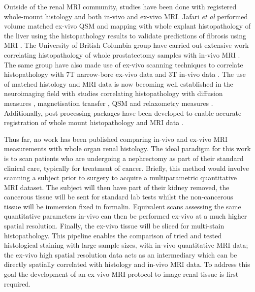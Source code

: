 Outside of the renal \ac{MRI} community, studies have been done with registered whole-mount histology and both in-vivo and ex-vivo \ac{MRI}. Jafari \textit{et al} performed volume matched ex-vivo \ac{QSM} and \ttwostar mapping with whole explant histopathology of the liver using the histopathology results to validate predictions of fibrosis using \ac{MRI} \cite{jafari_integrated_2021}. The University of British Columbia group have carried out extensive work correlating histopathology of whole prostatectomy samples with in-vivo \ac{MRI} \cite{sabouri_mr_2017, dhatt_mri_2020}. The same group have also made use of ex-vivo scanning techniques to correlate histopathology with 7T narrow-bore ex-vivo data and 3T in-vivo data \cite{uribe_vivo_2015}. The use of matched histology and \ac{MRI} data is now becoming well established in the neuroimaging field \cite{lazari_can_2021} with studies correlating histopathology with diffusion measures \cite{peters_white_2019, moll_multiple_2011, howard_joint_2019, mollink_white_2019}, magnetisation transfer \cite{mottershead_high_2003, seewann_diffusely_2009}, \ac{QSM} \cite{hametner_influence_2018, stuber_myelin_2014} and relaxometry measures \cite{bagnato_untangling_2018, reeves_combined_2016}. Additionally, post processing packages have been developed to enable accurate registration of whole mount histopathology and \ac{MRI} data \cite{huszar_tensor_2019, huszar_automated_2019}.

Thus far, no work has been published comparing in-vivo and ex-vivo \ac{MRI} measurements with whole organ renal histology. The ideal paradigm for this work is to scan patients who are undergoing a nephrectomy as part of their standard clinical care, typically for treatment of cancer. Briefly, this method would involve scanning a subject prior to surgery to acquire a multiparametric quantitative \ac{MRI} dataset. The subject will then have part of their kidney removed, the cancerous tissue will be sent for standard lab tests whilst the non-cancerous tissue will be immersion fixed in formalin. Equivalent scans assessing the same quantitative parameters in-vivo can then be performed ex-vivo at a much higher spatial resolution. Finally, the ex-vivo tissue will be sliced for multi-stain histopathology. This pipeline enables the comparison of tried and tested histological staining with large sample sizes, with in-vivo quantitative \ac{MRI} data; the ex-vivo high spatial resolution data acts as an intermediary which can be directly spatially correlated with histology and in-vivo \ac{MRI} data. To address this goal the development of an ex-vivo \ac{MRI} protocol to image renal tissue is first required.

